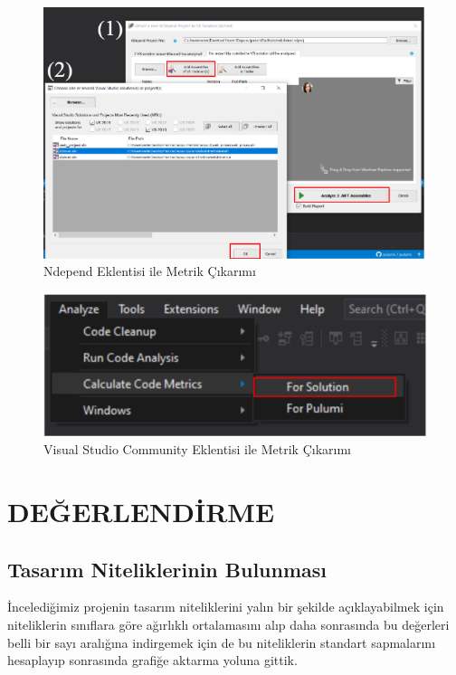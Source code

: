 \documentclass[conference]{IEEEtran}
\begin{document}
\begin{figure}[h]
	\centering
\includegraphics[scale=0.785]{3.png}
	\caption{Ndepend Eklentisi ile Metrik Çıkarımı}
	\label{sekil1}
\end{figure}

\begin{figure}[h]
	\centering
\includegraphics[scale=0.550]{VS Community.png}
	\caption{Visual Studio Community Eklentisi ile Metrik Çıkarımı}
	\label{sekil2}
	

\end{figure}





\vspace{150}
\section{DEĞERLENDİRME}
\subsection{Tasarım Niteliklerinin Bulunması}
İncelediğimiz projenin tasarım niteliklerini yalın bir şekilde
 açıklayabilmek için niteliklerin sınıflara göre ağırlıklı 
ortalamasını alıp daha sonrasında bu değerleri belli bir sayı 
aralığına indirgemek için de bu niteliklerin standart sapmalarını 
hesaplayıp sonrasında grafiğe aktarma yoluna gittik.
\end{document}
